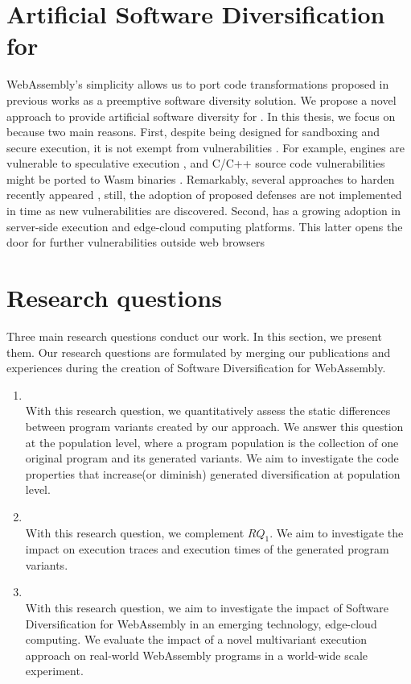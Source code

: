 \section{Artificial Software Diversification for \wasm}


WebAssembly's simplicity allows us to port code transformations proposed in previous works as a preemptive software diversity solution.
We propose a novel approach to provide artificial software diversity for \wasm.
In this thesis, we focus on \wasm because two main reasons. First,
despite being designed for sandboxing and secure execution, it is not exempt from vulnerabilities \cite{WebAssemblySecurity}.
For example, \wasm engines are vulnerable to speculative execution \cite{Narayan2021Swivel}, and C/C++ source code vulnerabilities might be ported to Wasm binaries \cite{DeRoover2022}.  
Remarkably, several approaches to harden \wasm recently appeared \cite{johnson2021}, still, the adoption of proposed defenses are not implemented in time as new vulnerabilities are discovered.
Second, \wasm has a growing adoption in server-side execution and edge-cloud computing platforms.
This latter opens the door for further vulnerabilities outside web browsers

\section{Research questions}
\label{intro:definition:rq}

Three main research questions conduct our work.
In this section, we present them. 
Our research questions are formulated by merging our publications and experiences during the creation of Software Diversification for WebAssembly. 


\begin{enumerate}[label=\subscript{RQ}{{\arabic*}}]
    \item \textbf{\rqone}\\
    With this research question, we quantitatively assess the static differences between program variants created by our approach. We answer this question at the population level, where a program population is the collection of one original program and its generated variants. We aim to investigate the code properties that increase(or diminish) generated diversification at population level. 

    \item \textbf{\rqtwo} \\
    With this research question, we complement $RQ_1$. We aim to investigate the impact on execution traces and execution times of the generated program variants.

    \item \textbf{\rqthree} \\
    With this research question, we aim to investigate the impact of Software Diversification for WebAssembly in an emerging technology, edge-cloud computing. We evaluate the impact of a novel multivariant execution approach on real-world WebAssembly programs in a world-wide scale experiment.
    
    
\end{enumerate}



